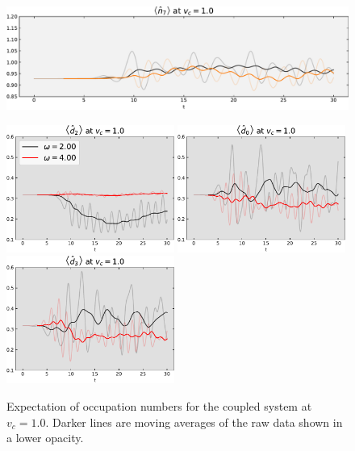 \begin{figure}[!hbt]
{{\begin{minipage}[b]{.59\textwidth}
                \includegraphics[trim=0 0 0 -4, clip, width=1.00\textwidth]{graph/occupation/occupation_site_7_vc_10.pdf}
       \caption{Expectation of occupation numbers for the coupled system at $v_c = 1.0$. Darker lines are moving averages of the raw data shown in a lower opacity.}
        \label{fig:occupation_vc_10}
    \end{minipage}
    \hfill
    \begin{minipage}[b]{.59\textwidth}
                \centering
                \includegraphics[width=0.49\textwidth]{graph/double_occupation/double_occupation_vc_10_site_2.pdf}
                \includegraphics[width=0.49\textwidth]{graph/double_occupation/double_occupation_vc_10_site_0.pdf}
                \includegraphics[width=0.49\textwidth]{graph/double_occupation/double_occupation_vc_10_site_3.pdf}

\end{minipage}}}
\end{figure}
